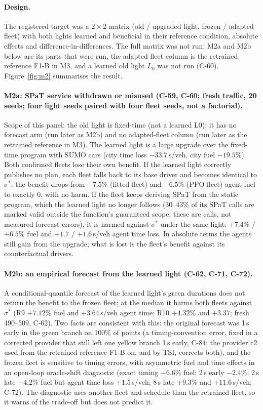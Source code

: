 \documentclass[11pt]{article}
\begin{document}
\paragraph{Design.} The registered target was a $2\times2$ matrix (old / upgraded light, frozen / adapted fleet) with both lights learned and
beneficial in their reference condition, absolute effects and difference-in-differences. The full matrix was not run: M2a and M2b below are
its parts that were run, the adapted-fleet column is the retrained reference F1-B in M3, and a learned old light $L_0$ was not run (C-60).
Figure~\ref{fig:m2} summarises the result.
\paragraph{M2a: SPaT service withdrawn or misused (C-59, C-60; fresh traffic, 20 seeds; four light seeds paired with four fleet
seeds, not a factorial).} Scope of this panel: the old light is fixed-time (not a learned L0); it has no forecast arm (run later as M2b)
and no adapted-fleet column (run later as the retrained reference in M3). The learned light is a large
upgrade over the fixed-time program with SUMO cars (city time loss $-33.7$\,s/veh, city fuel $-19.5\%$). Both confirmed fleets lose their
own benefit. If the learned light correctly publishes no plan, each fleet falls back to its base driver and becomes identical to
$\sigma^*$: the benefit drops from $-7.5\%$ (fitted fleet) and $-6.5\%$ (PPO fleet) agent fuel to exactly 0, with no harm. If the fleet
keeps deriving SPaT from the static program, which the learned light no longer follows (30--43\% of its SPaT calls are marked valid
outside the function's guaranteed scope; these are calls, not measured forecast errors), it is harmed against $\sigma^*$ under the same light: $+7.4\%$ / $+6.5\%$ fuel and $+1.7$ / $+1.6$\,s/veh agent time loss. In
absolute terms the agents still gain from the upgrade; what is lost is the fleet's benefit against its counterfactual drivers.
\paragraph{M2b: an empirical forecast from the learned light (C-62, C-71, C-72).} A conditional-quantile forecast of the learned light's
green durations does not return the benefit to the frozen fleet; at the median it harms both fleets against $\sigma^*$ (R9 $+7.12\%$ fuel and
$+3.64$\,s/veh agent time; R10 $+4.32\%$ and $+3.37$; fresh 490--509, C-62). Two facts are consistent with this: the original forecast was 1\,s early in
the green branch on 100\% of points (a timing-convention error, fixed in a corrected provider that still left one yellow branch 1\,s early, C-84; the provider c2 used from
the retrained reference F1-B on, and by TSI, corrects both),
and the frozen fleet is sensitive to timing errors, with asymmetric fuel and time effects in an open-loop oracle-shift diagnostic (exact
timing $-6.6\%$ fuel; 2\,s early $-2.4\%$; 2\,s late $-4.2\%$ fuel but agent time loss $+1.5$\,s/veh; 8\,s late $+9.3\%$ and $+11.6$\,s/veh;
C-72). The diagnostic uses another fleet and schedule than the retrained fleet, so it warns of the trade-off but does not predict it.
\end{document}
